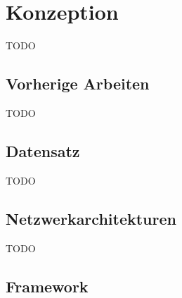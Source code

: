 \chapter{Konzeption}
TODO

\section{Vorherige Arbeiten}
TODO
\section{Datensatz}
TODO
\section{Netzwerkarchitekturen}
TODO
\section{Framework}